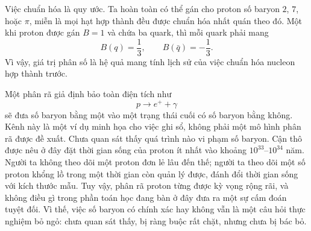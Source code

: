 \begin{classroomqa}
\end{classroomqa}

Việc chuẩn hóa là quy ước. Ta hoàn toàn có thể gán cho proton số baryon \(2\), \(7\), hoặc \(\pi\), miễn là mọi hạt hợp thành đều được chuẩn hóa nhất quán theo đó. Một khi proton được gán \(B=1\) và chứa ba quark, thì mỗi quark phải mang
\begin{equation}
B(q)=\frac13,
\qquad
B(\bar q)=-\frac13.
\end{equation}
Vì vậy, giá trị phân số là hệ quả mang tính lịch sử của việc chuẩn hóa nucleon hợp thành trước.

\begin{classroomqa}
\end{classroomqa}

Một phân rã giả định bảo toàn điện tích như
\begin{equation}
p\longrightarrow e^++\gamma
\end{equation}
sẽ đưa số baryon bằng một vào một trạng thái cuối có số baryon bằng không. Kênh này là một ví dụ minh họa cho việc ghi sổ, không phải một mô hình phân rã được đề xuất. Chưa quan sát thấy quá trình nào vi phạm số baryon. Cận thô được nêu ở đây đặt thời gian sống của proton ít nhất vào khoảng \(10^{33}\)--\(10^{34}\) năm. Người ta không theo dõi một proton đơn lẻ lâu đến thế; người ta theo dõi một số proton khổng lồ trong một thời gian còn quản lý được, đánh đổi thời gian sống với kích thước mẫu. Tuy vậy, phân rã proton từng được kỳ vọng rộng rãi, và không điều gì trong phần toán học đang bàn ở đây đưa ra một sự cấm đoán tuyệt đối. Vì thế, việc số baryon có chính xác hay không vẫn là một câu hỏi thực nghiệm bỏ ngỏ: chưa quan sát thấy, bị ràng buộc rất chặt, nhưng chưa bị bác bỏ.

